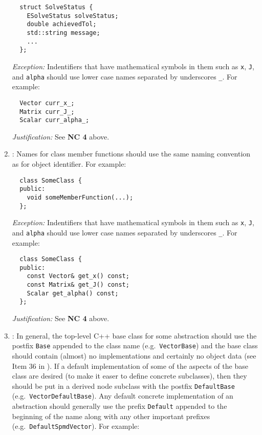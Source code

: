 \begin{enumerate}
{\small\begin{verbatim}
  struct SolveStatus {
    ESolveStatus solveStatus;
    double achievedTol;
    std::string message;
    ...
  };
\end{verbatim}}

{}\textit{Exception:} Indentifiers that have mathematical symbols in them such
as {}\texttt{x}, {}\texttt{J}, and {}\texttt{alpha} should use lower case
names separated by underscores {}\texttt{\_}.  For example:

{\small\begin{verbatim}
  Vector curr_x_;
  Matrix curr_J_;
  Scalar curr_alpha_;
\end{verbatim}}

{}\textit{Justification:} See {}\textbf{NC 4} above.

{}\item\NCFunctionNames: Names for class member functions should use the same
naming convention as for object identifier.  For example:

{\small\begin{verbatim}
  class SomeClass {
  public:
    void someMemberFunction(...);
  };
\end{verbatim}}

{}\textit{Exception:} Indentifiers that have mathematical symbols in them such
as {}\texttt{x}, {}\texttt{J}, and {}\texttt{alpha} should use lower case
names separated by underscores {}\texttt{\_}.  For example:

{\small\begin{verbatim}
  class SomeClass {
  public:
    const Vector& get_x() const;
    const Matrix& get_J() const;
    Scalar get_alpha() const;
  };
\end{verbatim}}

{}\textit{Justification:} See {}\textbf{NC 4} above.

{}\item\NCBaseDefaultClassNames: In general, the top-level C++ base class for some
abstraction should use the postfix {}\texttt{Base} appended to the class name
(e.g.\ {}\texttt{Vector\-Base}) and the base class should contain (almost) no
implementations and certainly no object data (see Item 36 in
{}\cite{C++CodingStandards05}).  If a default implementation of some of the
aspects of the base class are desired (to make it easer to define concrete
subclasses), then they should be put in a derived node subclass with the
postfix {}\texttt{DefaultBase} (e.g.\ {}\texttt{Vector\-Default\-Base}).  Any
default concrete implementation of an abstraction should generally use the
prefix {}\texttt{Default} appended to the beginning of the name along with any
other important prefixes (e.g.\ {}\texttt{DefaultSpmdVector}).  For example:


\end{enumerate}

